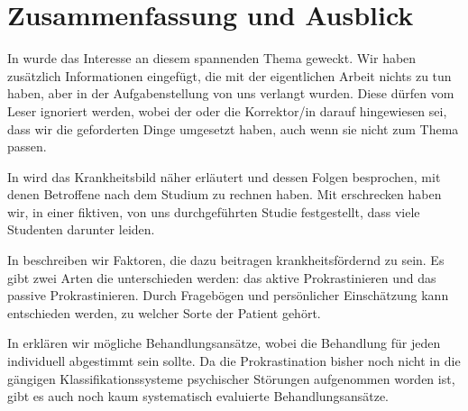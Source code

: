\chapter{Zusammenfassung und Ausblick}
\label{cha:zusammenfassung}
		
In  wurde das Interesse an diesem spannenden Thema geweckt. Wir haben zusätzlich Informationen eingefügt, die mit der eigentlichen Arbeit nichts zu tun haben, aber in der Aufgabenstellung von uns verlangt wurden. Diese dürfen vom Leser ignoriert werden, wobei der oder die Korrektor/in darauf hingewiesen sei, dass wir die geforderten Dinge umgesetzt haben, auch wenn sie nicht zum Thema passen.

In  wird das Krankheitsbild näher erläutert und dessen Folgen besprochen, mit denen Betroffene nach dem Studium zu rechnen haben. Mit erschrecken haben wir, in einer fiktiven, von uns durchgeführten Studie festgestellt, dass viele Studenten darunter leiden.

In  beschreiben wir Faktoren, die dazu beitragen krankheitsfördernd zu sein. Es gibt zwei Arten die unterschieden werden: das aktive Prokrastinieren und das passive Prokrastinieren. Durch Fragebögen und persönlicher Einschätzung kann entschieden werden, zu welcher Sorte der Patient gehört.

In  erklären wir mögliche Behandlungsansätze, wobei die Behandlung für jeden individuell abgestimmt sein sollte. Da die Prokrastination bisher noch nicht in die gängigen Klassifikationssysteme psychischer
Störungen aufgenommen worden ist, gibt es auch noch kaum systematisch evaluierte Behandlungsansätze. 


